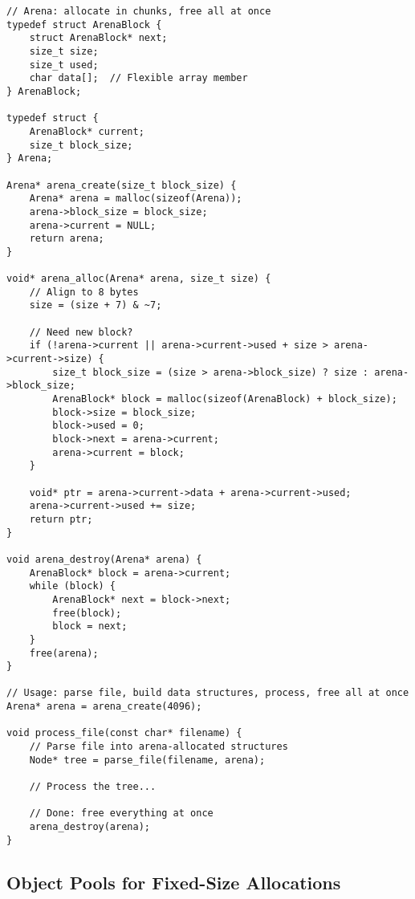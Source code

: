 \begin{lstlisting}
// Arena: allocate in chunks, free all at once
typedef struct ArenaBlock {
    struct ArenaBlock* next;
    size_t size;
    size_t used;
    char data[];  // Flexible array member
} ArenaBlock;

typedef struct {
    ArenaBlock* current;
    size_t block_size;
} Arena;

Arena* arena_create(size_t block_size) {
    Arena* arena = malloc(sizeof(Arena));
    arena->block_size = block_size;
    arena->current = NULL;
    return arena;
}

void* arena_alloc(Arena* arena, size_t size) {
    // Align to 8 bytes
    size = (size + 7) & ~7;

    // Need new block?
    if (!arena->current || arena->current->used + size > arena->current->size) {
        size_t block_size = (size > arena->block_size) ? size : arena->block_size;
        ArenaBlock* block = malloc(sizeof(ArenaBlock) + block_size);
        block->size = block_size;
        block->used = 0;
        block->next = arena->current;
        arena->current = block;
    }

    void* ptr = arena->current->data + arena->current->used;
    arena->current->used += size;
    return ptr;
}

void arena_destroy(Arena* arena) {
    ArenaBlock* block = arena->current;
    while (block) {
        ArenaBlock* next = block->next;
        free(block);
        block = next;
    }
    free(arena);
}

// Usage: parse file, build data structures, process, free all at once
Arena* arena = arena_create(4096);

void process_file(const char* filename) {
    // Parse file into arena-allocated structures
    Node* tree = parse_file(filename, arena);

    // Process the tree...

    // Done: free everything at once
    arena_destroy(arena);
}
\end{lstlisting}

\subsection{Object Pools for Fixed-Size Allocations}


